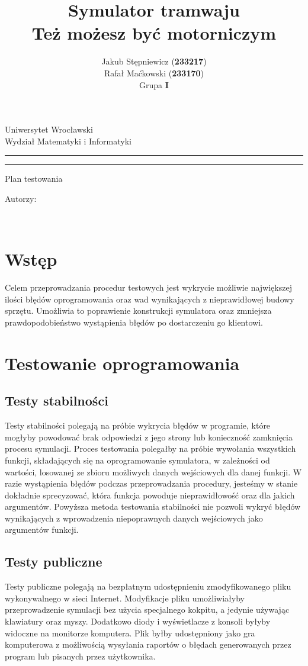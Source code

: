 \documentclass[12pt,a4paper]{article}
\author{Jakub Stępniewicz (\textbf{233217})\\Rafał Maćkowski (\textbf{233170})\\Grupa {\bf I}}
\title{Symulator tramwaju\\ \small{Też możesz być motorniczym}}
\makeatletter
\newcommand{\linia}{\rule{\linewidth}{0.4mm}}
\renewcommand{\maketitle}{\begin{titlepage}
		\vspace*{1cm}
    \begin{center}\small
    	Uniwersytet Wrocławski\\
    	Wydział Matematyki i Informatyki\\
    \end{center}
    \vspace{3cm}
    \noindent
    \linia
    \begin{center}
    	\LARGE{\textsc{\@title}}
         \end{center}
     \linia
    \begin{center}
    	\Large{Plan testowania}
         \end{center}
    \vspace{0.5cm}

    \begin{flushright}

    \begin{minipage}{5.5cm}

    	\small Autorzy:

    \normalsize {\@author} \par
    

    \end{minipage}
    \vspace{5cm}

     

     \end{flushright}

    \vspace*{\stretch{6}}

    \begin{center}

    \@date\\

    \end{center}

  \end{titlepage}%

}
\makeatother
\begin{document}
\maketitle
\tableofcontents
\vspace{5cm}
\newpage
% 
\section{Wstęp}
Celem przeprowadzania procedur testowych jest wykrycie możliwie największej ilości błędów 
oprogramowania oraz wad wynikających z nieprawidłowej budowy sprzętu. Umożliwia to poprawienie 
konstrukcji symulatora oraz zmniejsza prawdopodobieństwo wystąpienia błędów po dostarczeniu go 
klientowi.

\section{Testowanie oprogramowania}
\subsection{Testy stabilności}
Testy stabilności polegają na próbie wykrycia błędów w programie, które mogłyby powodować brak 
odpowiedzi z jego strony lub konieczność zamknięcia procesu symulacji. Proces testowania polegałby 
na próbie wywołania wszystkich funkcji, składających się na oprogramowanie symulatora, w zależności 
od wartości, losowanej ze zbioru możliwych danych wejściowych dla danej funkcji. W razie wystąpienia 
błędów podczas przeprowadzania procedury, jesteśmy w stanie dokładnie sprecyzować, która funkcja 
powoduje nieprawidłowość oraz dla jakich argumentów. Powyższa metoda testowania stabilności nie 
pozwoli wykryć błędów wynikających z wprowadzenia niepoprawnych danych wejściowych jako argumentów 
funkcji.

\subsection{Testy publiczne}
Testy publiczne polegają na bezpłatnym udostępnieniu zmodyfikowanego pliku wykonywalnego w sieci 
Internet. Modyfikacje pliku umożliwiałyby przeprowadzenie symulacji bez użycia specjalnego kokpitu, a jedynie
używając klawiatury oraz 
myszy. Dodatkowo diody i wyświetlacze z konsoli byłyby widoczne na monitorze komputera. Plik byłby 
udostępniony jako gra komputerowa z możliwością wysyłania raportów o błędach generowanych przez 
program lub pisanych przez użytkownika.
\end{document}
